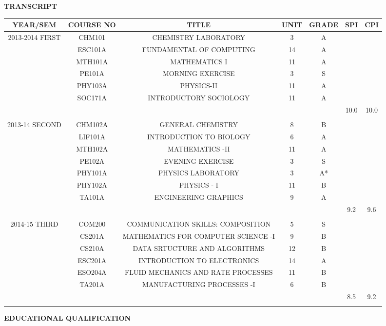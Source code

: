 \documentclass[10pt]{article}
\begin{document}
\begin{flushleft}
\begin{center}
{\large \textbf{TRANSCRIPT} }
\end{center}
\begin{tabular}{c c c c c c c}
\hline 
YEAR/SEM & COURSE NO & TITLE & UNIT & GRADE & SPI & CPI\\
\hline
2013-2014 FIRST & CHM101 & CHEMISTRY LABORATORY & 3 & A\\
  & ESC101A & {\small  FUNDAMENTAL OF COMPUTING} & 14 & A\\
  & MTH101A &  MATHEMATICS I & 11 & A\\
 & PE101A & MORNING EXERCISE & 3 & S\\
  & PHY103A & PHYSICS-II & 11 & A\\
  & SOC171A & INTRODUCTORY SOCIOLOGY & 11 & A\\
 & & & & & 10.0 & 10.0\\ 
 & & & & & &\\
 2013-14 SECOND & CHM102A  & GENERAL CHEMISTRY & 8 & B\\
   & LIF101A & INTRODUCTION TO BIOLOGY & 6 & A\\
   & MTH102A  & MATHEMATICS -II & 11 & A\\
   & PE102A & EVENING EXERCISE & 3 & S\\
   &PHY101A &  PHYSICS LABORATORY & 3 & A*\\
   &PHY102A & PHYSICS - I & 11 & B\\
   &TA101A& ENGINEERING GRAPHICS & 9 & A\\
   & & & & & 9.2 & 9.6 \\
   & & & & & & \\
2014-15 THIRD & COM200 & COMMUNICATION SKILLS: COMPOSITION & 5 & S\\
  & CS201A & MATHEMATICS FOR COMPUTER SCIENCE -I & 9 & B\\
  & CS210A &  DATA SRTUCTURE AND ALGORITHMS & 12 & B\\
  & ESC201A & INTRODUCTION TO ELECTRONICS & 14 & A \\
  & ESO204A & FLUID MECHANICS AND RATE PROCESSES & 11 & B\\
  & TA201A & MANUFACTURING PROCESSES -I & 6 & B\\
  & & & & & 8.5 & 9.2\\
  & & & & & &\\
\end{tabular}
{\large \textbf{EDUCATIONAL QUALIFICATION}}
\begin{tabular}{c c c c}

\end{tabular}
\end{flushleft}
\end{document}
